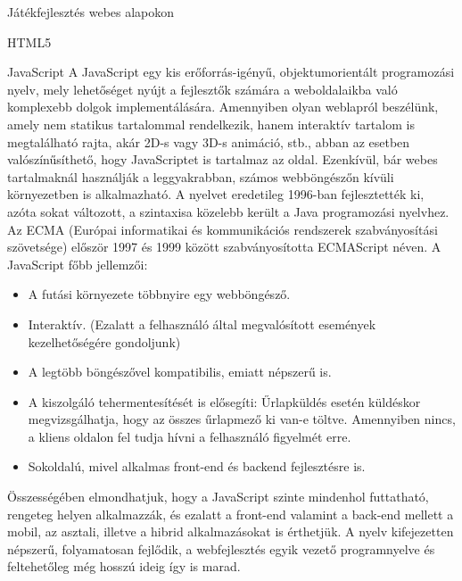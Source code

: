 \begin{MyChapter}{Játékfejlesztés webes alapokon}
\begin{MySection}{HTML5}
	\end{MySection}

	\begin{MySection}{JavaScript}
		A JavaScript egy kis erőforrás-igényű, objektumorientált programozási nyelv, mely lehetőséget nyújt a fejlesztők számára a weboldalaikba való komplexebb dolgok implementálására. Amennyiben olyan weblapról beszélünk, amely nem statikus tartalommal rendelkezik, hanem interaktív tartalom is megtalálható rajta, akár 2D-s vagy 3D-s animáció, stb., abban az esetben valószínűsíthető, hogy JavaScriptet is tartalmaz az oldal. Ezenkívül, bár webes tartalmaknál használják a leggyakrabban, számos webböngészőn kívüli környezetben is alkalmazható. A nyelvet eredetileg 1996-ban fejlesztették ki, azóta sokat változott, a szintaxisa közelebb került a Java programozási nyelvhez. Az ECMA (Európai informatikai és kommunikációs rendszerek szabványosítási szövetsége) először 1997 és 1999 között szabványosította ECMAScript néven.
		A JavaScript főbb jellemzői:
		\begin{itemize}
			\item A futási környezete többnyire egy webböngésző.
			\item Interaktív. (Ezalatt a felhasználó által megvalósított események kezelhetőségére gondoljunk)
			\item A legtöbb böngészővel kompatibilis, emiatt népszerű is.
			\item A kiszolgáló tehermentesítését is elősegíti: Űrlapküldés esetén küldéskor megvizsgálhatja, hogy az összes űrlapmező ki van-e töltve. Amennyiben nincs, a kliens oldalon fel tudja hívni a felhasználó figyelmét erre.
			\item Sokoldalú, mivel alkalmas front-end és backend fejlesztésre is.
		\end{itemize}
		Összességében elmondhatjuk, hogy a JavaScript szinte mindenhol futtatható, rengeteg helyen alkalmazzák, és ezalatt a front-end valamint a back-end mellett a mobil, az asztali, illetve a hibrid alkalmazásokat is érthetjük. A nyelv kifejezetten népszerű, folyamatosan fejlődik, a webfejlesztés egyik vezető programnyelve és feltehetőleg még hosszú ideig így is marad.
	\end{MySection}


\end{MyChapter}
